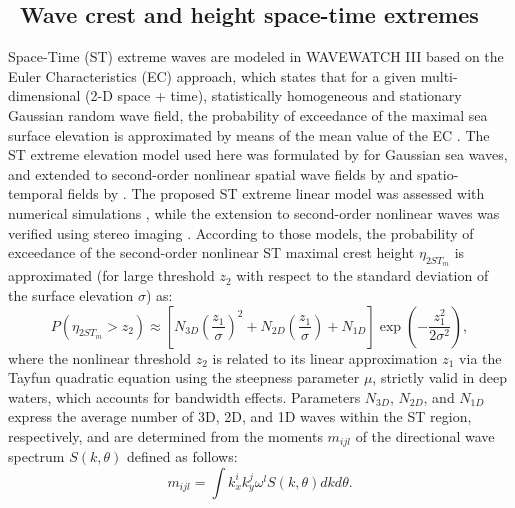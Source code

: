 \vssub
\subsection{~Wave crest and height space-time extremes} \label{sub:space_time_ext}

Space-Time (ST) extreme waves are modeled in WAVEWATCH III based on the Euler Characteristics (EC) approach, which states that for a given multi-dimensional (2-D space + time), statistically homogeneous and stationary Gaussian random wave field, the probability of exceedance of the maximal sea surface elevation is approximated by means of the mean value of the EC \citep{Fed12eu}. The ST extreme elevation model used here was formulated by \cite{Fed12sp} for Gaussian sea waves, and extended to second-order nonlinear spatial wave fields by \cite{Fed13} and spatio-temporal fields by \cite{Beet15}. The proposed ST extreme linear model was assessed with numerical simulations \citep{Baet15}, while the extension to second-order nonlinear waves was verified using stereo imaging \citep{Fed13,Beet15}. According to those models, the probability of exceedance of the second-order nonlinear ST maximal crest height $\eta_{2ST_m}$ is approximated (for large threshold $z_2$ with respect to the standard deviation of the surface elevation $\sigma$) as:
\begin{equation}
P(\eta_{2ST_m} > z_2) \approx \left[N_{3D} \left( \frac{z_1}{\sigma} \right)^{2} + N_{2D} \left( \frac{z_1}{\sigma} \right) + N_{1D} \right] \exp{ \left( -\frac{z_1^2}{2 \sigma^2} \right)},
\label{eq_STE1}
\end{equation}
where the nonlinear threshold $z_2$ is related to its linear approximation $z_1$ via the Tayfun quadratic equation using the steepness parameter $\mu$, strictly valid in deep waters, which accounts for bandwidth effects. Parameters $N_{3D}$, $N_{2D}$, and $N_{1D}$ express the average number of 3D, 2D, and 1D waves within the ST region, respectively, and are determined from the moments $m_{ijl}$ of the directional wave spectrum $S(k, \theta)$ defined as follows:
\begin{equation}
m_{ijl}=\int k_{x}^{i}k_{y}^{j}\omega^{l}S(k,\theta)dkd\theta.
\label{eq_STE2}
\end{equation}

